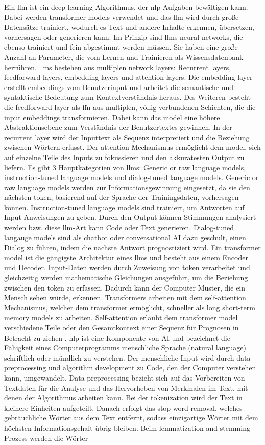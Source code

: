 Ein \gls{llm} ist ein deep learning Algorithmus, der \gls{nlp}-Aufgaben bewältigen kann. Dabei werden transformer models verwendet und das \gls{llm} wird durch große Datensätze trainiert, wodurch es Text und andere Inhalte erkennen, übersetzen, vorhersagen oder generieren kann. Im Prinzip sind \gls{llm}s neural networks, die ebenso trainiert und fein abgestimmt werden müssen. Sie haben eine große Anzahl an Parameter, die vom Lernen und Trainieren als Wissensdatenbank herrühren. \gls{llm}s bestehen aus multiplen network layers: Recurrent layers, feedforward layers, embedding layers und attention layers. Die embedding layer erstellt embeddings vom Benutzerinput und arbeitet die semantische und syntaktische Bedeutung zum Kontextverständnis heraus. Des Weiteren besteht die feedforward layer als \gls{ffn} aus multiplen, völlig verbundenen Schichten, die die input embeddings transformieren. Dabei kann das model eine höhere Abstraktionsebene zum Verständnis der Benutzertextes gewinnen. In der recurrent layer wird der Inputtext als Sequenz interpretiert und die Beziehung zwischen Wörtern erfasst. Der attention Mechanismus ermöglicht dem model, sich auf einzelne Teile des Inputs zu fokussieren und den akkuratesten Output zu liefern. Es gibt 3 Hauptkategorien von \gls{llm}s: Generic or raw language models, instruction-tuned language models und dialog-tuned language models. Generic or raw language models werden zur Informationsgewinnung eingesetzt, da sie den nächsten token, basierend auf der Sprache der Trainingsdaten, vorhersagen können. Instruction-tuned language models sind trainiert, um Antworten auf Input-Anweisungen zu geben. Durch den Output können Stimmungen analysiert werden bzw. diese \gls{llm}-Art kann Code oder Text generieren. Dialog-tuned langauge models sind als chatbot oder conversational AI dazu geschult, einen Dialog zu führen, indem die nächste Antwort prognostiziert wird. Ein transformer model ist die gängigste Architektur eines \gls{llm}s und besteht aus einem Encoder und Decoder. Input-Daten werden durch Zuweisung von token verarbeitet und gleichzeitig werden mathematische Gleichungen ausgeführt, um die Beziehung zwischen den token zu erfassen. Dadurch kann der Computer Muster, die ein Mensch sehen würde, erkennen. Transformers arbeiten mit dem self-attention Mechanismus, welcher dem transformer ermöglicht, schneller als long short-term memory models zu arbeiten. Self-attention erlaubt dem transformer model verschiedene Teile oder den Gesamtkontext einer Sequenz für Prognosen in Betracht zu ziehen \cite{llm-def}. \gls{nlp} ist eine Komponente von AI und bezeichnet die Fähigkeit eines Computerprogramms menschliche Sprache (natural language) schriftlich oder mündlich zu verstehen. Der menschliche Input wird durch data preprocessing und algorithm development zu Code, den der Computer verstehen kann, umgewandelt. Data preprocessing bezieht sich auf das Vorbereiten von Textdaten für die Analyse und das Hervorheben von Merkmalen im Text, mit denen der Algorithmus arbeiten kann. Bei der tokenization wird der Text in kleinere Einheiten aufgeteilt. Danach erfolgt das stop word removal, welches gebräuchliche Wörter aus dem Text entfernt, sodass einzigartige Wörter mit dem höchsten Informationsgehalt übrig bleiben. Beim lemmatization and stemming Prozess werden die Wörter 